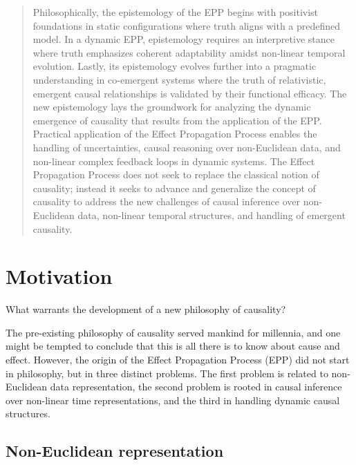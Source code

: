 \documentclass{article}
\begin{document}
\begin{abstract}
Philosophically, the epistemology of the EPP begins with positivist foundations in static configurations where truth aligns with 
a predefined model. In a dynamic EPP, epistemology requires an interpretive stance where truth emphasizes coherent adaptability 
amidst non-linear temporal evolution. Lastly, its epistemology evolves further into a pragmatic understanding in co-emergent 
systems where the truth of relativistic, emergent causal relationships is validated by their functional efficacy. 
The new epistemology lays the groundwork for analyzing the dynamic emergence of causality that results from the application of the EPP.
Practical application of the Effect Propagation Process enables the handling of uncertainties, causal reasoning 
over non-Euclidean data, and non-linear complex feedback loops in dynamic systems.\newline
The Effect Propagation Process does not seek to replace the classical notion of causality; instead it seeks to advance and generalize the concept of causality to address the new challenges of causal inference over non-Euclidean data, non-linear temporal structures, and handling of emergent causality.
\end{abstract}



\newpage

\section{Motivation}
\label{sec:motivation}


What warrants the development of a new philosophy of causality?

The pre-existing philosophy of causality served mankind for millennia, and one might be tempted to conclude that this is all there is to know about cause and effect. However, the origin of the Effect Propagation Process (EPP) did not start in philosophy, but in three distinct problems. The first problem is related to non-Euclidean data representation, the second problem is rooted in causal inference over non-linear time representations, and the third in handling dynamic causal structures.

\subsection{Non-Euclidean representation}
\end{document}
